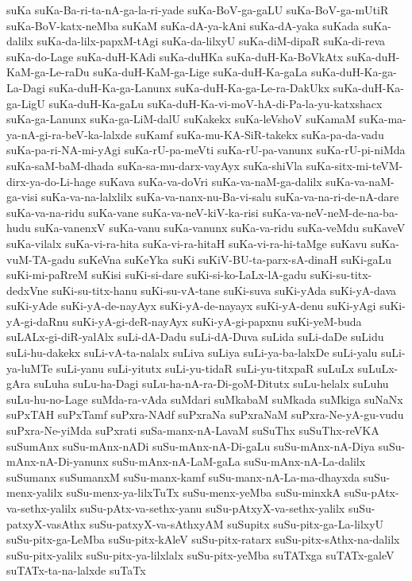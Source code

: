 {suKa
suKa-Ba-ri-ta-nA-ga-la-ri-yade
suKa-BoV-ga-gaLU
suKa-BoV-ga-mUtiR
suKa-BoV-katx-neMba
suKaM
suKa-dA-ya-kAni
suKa-dA-yaka
suKada
suKa-dalilx
suKa-da-lilx-papxM-tAgi
suKa-da-lilxyU
suKa-diM-dipaR
suKa-di-reva
suKa-do-Lage
suKa-duH-KAdi
suKa-duHKa
suKa-duH-Ka-BoVkAtx
suKa-duH-KaM-ga-Le-raDu
suKa-duH-KaM-ga-Lige
suKa-duH-Ka-gaLa
suKa-duH-Ka-ga-La-Dagi
suKa-duH-Ka-ga-Lanunx
suKa-duH-Ka-ga-Le-ra-DakUkx
suKa-duH-Ka-ga-LigU
suKa-duH-Ka-gaLu
suKa-duH-Ka-vi-moV-hA-di-Pa-la-yu-katxshacx
suKa-ga-Lanunx
suKa-ga-LiM-dalU
suKakekx
suKa-leVshoV
suKamaM
suKa-ma-ya-nA-gi-ra-beV-ka-lalxde
suKamf
suKa-mu-KA-SiR-takekx
suKa-pa-da-vadu
suKa-pa-ri-NA-mi-yAgi
suKa-rU-pa-meVti
suKa-rU-pa-vanunx
suKa-rU-pi-niMda
suKa-saM-baM-dhada
suKa-sa-mu-darx-vayAyx
suKa-shiVla
suKa-sitx-mi-teVM-dirx-ya-do-Li-hage
suKava
suKa-va-doVri
suKa-va-naM-ga-dalilx
suKa-va-naM-ga-visi
suKa-va-na-lalxlilx
suKa-va-nanx-nu-Ba-vi-salu
suKa-va-na-ri-de-nA-dare
suKa-va-na-ridu
suKa-vane
suKa-va-neV-kiV-ka-risi
suKa-va-neV-neM-de-na-ba-hudu
suKa-vanenxV
suKa-vanu
suKa-vanunx
suKa-va-ridu
suKa-veMdu
suKaveV
suKa-vilalx
suKa-vi-ra-hita
suKa-vi-ra-hitaH
suKa-vi-ra-hi-taMge
suKavu
suKa-vuM-TA-gadu
suKeVna
suKeYka
suKi
suKiV-BU-ta-parx-sA-dinaH
suKi-gaLu
suKi-mi-paRreM
suKisi
suKi-si-dare
suKi-si-ko-LaLx-lA-gadu
suKi-su-titx-dedxVne
suKi-su-titx-hanu
suKi-su-vA-tane
suKi-suva
suKi-yAda
suKi-yA-dava
suKi-yAde
suKi-yA-de-nayAyx
suKi-yA-de-nayayx
suKi-yA-denu
suKi-yAgi
suKi-yA-gi-daRnu
suKi-yA-gi-deR-nayAyx
suKi-yA-gi-papxnu
suKi-yeM-buda
suLALx-gi-diR-yalAlx
suLi-dA-Dadu
suLi-dA-Duva
suLida
suLi-daDe
suLidu
suLi-hu-dakekx
suLi-vA-ta-nalalx
suLiva
suLiya
suLi-ya-ba-lalxDe
suLi-yalu
suLi-ya-luMTe
suLi-yanu
suLi-yitutx
suLi-yu-tidaR
suLi-yu-titxpaR
suLuLx
suLuLx-gAra
suLuha
suLu-ha-Dagi
suLu-ha-nA-ra-Di-goM-Ditutx
suLu-helalx
suLuhu
suLu-hu-no-Lage
suMda-ra-vAda
suMdari
suMkabaM
suMkada
suMkiga
suNaNx
suPxTAH
suPxTamf
suPxra-NAdf
suPxraNa
suPxraNaM
suPxra-Ne-yA-gu-vudu
suPxra-Ne-yiMda
suPxrati
suSa-manx-nA-LavaM
suSuThx
suSuThx-reVKA
suSumAnx
suSu-mAnx-nADi
suSu-mAnx-nA-Di-gaLu
suSu-mAnx-nA-Diya
suSu-mAnx-nA-Di-yanunx
suSu-mAnx-nA-LaM-gaLa
suSu-mAnx-nA-La-dalilx
suSumanx
suSumanxM
suSu-manx-kamf
suSu-manx-nA-La-ma-dhayxda
suSu-menx-yalilx
suSu-menx-ya-lilxTuTx
suSu-menx-yeMba
suSu-minxkA
suSu-pAtx-va-sethx-yalilx
suSu-pAtx-va-sethx-yanu
suSu-pAtxyX-va-sethx-yalilx
suSu-patxyX-vasAthx
suSu-patxyX-va-sAthxyAM
suSupitx
suSu-pitx-ga-La-lilxyU
suSu-pitx-ga-LeMba
suSu-pitx-kAleV
suSu-pitx-ratarx
suSu-pitx-sAthx-na-dalilx
suSu-pitx-yalilx
suSu-pitx-ya-lilxlalx
suSu-pitx-yeMba
suTATxga
suTATx-galeV
suTATx-ta-na-lalxde
suTaTx
}
